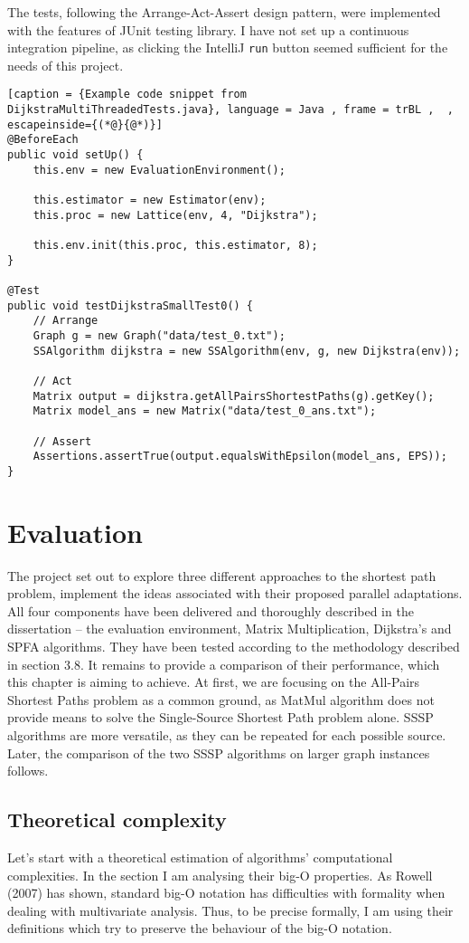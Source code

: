 \documentclass[12pt,a4paper,twoside,openright]{report}
\begin{document}
The tests, following the Arrange-Act-Assert design pattern, were implemented with the features of JUnit testing library. I have not set up a continuous integration pipeline, as clicking the IntelliJ \texttt{run} button seemed sufficient for the needs of this project.

\begin{lstlisting}[caption = {Example code snippet from DijkstraMultiThreadedTests.java}, language = Java , frame = trBL ,  , escapeinside={(*@}{@*)}]
@BeforeEach
public void setUp() {
    this.env = new EvaluationEnvironment();
    
    this.estimator = new Estimator(env);
    this.proc = new Lattice(env, 4, "Dijkstra");
    
    this.env.init(this.proc, this.estimator, 8);
}
    
@Test
public void testDijkstraSmallTest0() {
    // Arrange
    Graph g = new Graph("data/test_0.txt");
    SSAlgorithm dijkstra = new SSAlgorithm(env, g, new Dijkstra(env));

    // Act
    Matrix output = dijkstra.getAllPairsShortestPaths(g).getKey();
    Matrix model_ans = new Matrix("data/test_0_ans.txt");

    // Assert
    Assertions.assertTrue(output.equalsWithEpsilon(model_ans, EPS));
}

\end{lstlisting}
\chapter{Evaluation}
The project set out to explore three different approaches to the shortest path problem, implement the ideas associated with their proposed parallel adaptations. All four components have been delivered and thoroughly described in the dissertation -- the evaluation environment, Matrix Multiplication, Dijkstra's and SPFA algorithms. They have been tested according to the methodology described in section 3.8. It remains to provide a comparison of their performance, which this chapter is aiming to achieve. At first, we are focusing on the All-Pairs Shortest Paths problem as a common ground, as MatMul algorithm does not provide means to solve the Single-Source Shortest Path problem alone. SSSP algorithms are more versatile, as they can be repeated for each possible source. Later, the comparison of the two SSSP algorithms on larger graph instances follows.

\section{Theoretical complexity}
Let's start with a theoretical estimation of algorithms' computational complexities. In the section I am analysing their big-O properties. As Rowell (2007) \cite{asymptotic} has shown, standard big-O notation has difficulties with formality when dealing with multivariate analysis. Thus, to be precise formally, I am using their definitions which try to preserve the behaviour of the big-O notation. 
\end{document}
